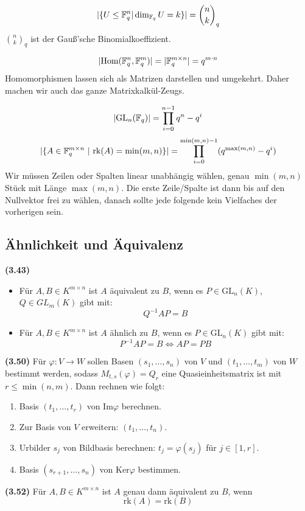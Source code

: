 \documentclass[a4paper,parskip=half*,DIV=15,fontsize=11pt]{scrartcl}
\newlength{\hangwidth}
\newcommand{\skript}[1]{\settowidth{\hangwidth}{\textbf{(#1)} }\hangpara{\hangwidth}{1}\textbf{(#1)} \ignorespaces} %
\newcommand{\rk}{\mathrm{rk}} %
\newcommand{\GL}{\mathrm{GL}} %
\newcommand{\Ker}{\mathrm{Ker}} %
\renewcommand{\Im}{\mathrm{Im}} %
\newcommand{\Field}{\mathbb{F}} %
\DeclarePairedDelimiter\abs{\lvert}{\rvert} %
\begin{document}
$$\abs{\{ U \leq \Field_q^n | \dim_{\Field_q} U = k \}} = \binom{n}{k}_q$$
$\binom{n}{k}_q$ ist der Gauß'sche Binomialkoeffizient.

$$\abs{\mathrm{Hom}(\Field_q^n,\Field_q^m)} = \abs{\Field_q^{m \times n}} = q^{m \cdot n}$$
Homomorphismen lassen sich als Matrizen darstellen und umgekehrt. Daher machen wir auch das ganze Matrixkalkül-Zeugs.

$$\abs{\GL_n(\Field_q)} = \prod_{i=0}^{n-1} q^n-q^i$$
$$\abs{\{A \in \Field_q^{m \times n} ~ | ~ \rk(A) = \min(m,n)\}} = \prod_{i=0}^{\min(m,n)-1} (q^{\max(m,n)}-q^i)$$
Wir müssen Zeilen oder Spalten linear unabhängig wählen, genau $\min(m,n)$ Stück mit Länge $\max(m,n)$. Die erste Zeile/Spalte ist dann bis auf den Nullvektor frei zu wählen, danach sollte jede folgende kein Vielfaches der vorherigen sein.

\subsection{Ähnlichkeit und Äquivalenz}

\skript{3.43} \begin{itemize}
	\item Für $A, B \in K^{m \times n}$ ist $A$ äquivalent zu $B$, wenn es $P \in \GL_n(K)$, $Q \in GL_m(K)$ gibt mit: $$Q^{-1} A P = B$$
	\item Für $A, B \in K^{m \times n}$ ist $A$ ähnlich zu $B$, wenn es $P \in \GL_n(K)$ gibt mit: $$P^{-1} A P = B \iff A P = P B$$
\end{itemize}

\skript{3.50} Für $\varphi : V \to W$ sollen Basen $(s_1, \ldots, s_n)$ von $V$ und $(t_1, \ldots, t_m)$ von $W$ bestimmt werden, sodass $M_{t,s}(\varphi) = Q_r$ eine Quasieinheitsmatrix ist mit $r \leq \min(n, m)$. Dann rechnen wie folgt: \begin{enumerate}
    \item Basis $(t_1, \ldots, t_r)$ von $\Im \varphi$ berechnen.
    \item Zur Basis von $V$ erweitern: $(t_1, \ldots, t_n)$.
    \item Urbilder $s_j$ von Bildbasis berechnen: $t_j = \varphi(s_j)$ für $j \in [1, r]$.
    \item Basis $(s_{r+1}, \ldots, s_n)$ von $\Ker \varphi$ bestimmen.
\end{enumerate}

\skript{3.52} Für $A, B \in K^{m \times n}$ ist $A$ genau dann äquivalent zu $B$, wenn $$\rk(A) = \rk(B)$$
\end{document}

